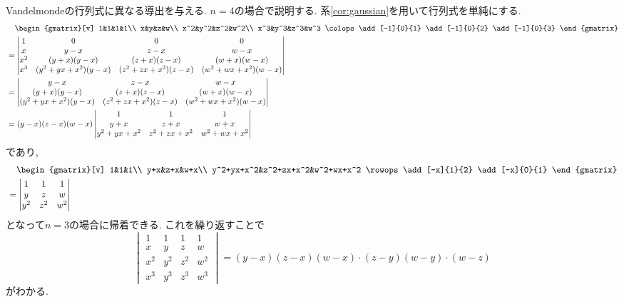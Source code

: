 \begin{eg}
Vandelmondeの行列式に異なる導出を与える.
$n=4$の場合で説明する.
系\ref{cor:gaussian}を用いて行列式を単純にする.
\begin{align*}
&\phantom{={}}\begin{gmatrix}[v]
1&1&1&1\\
x&y&z&w\\
x^2&y^2&z^2&w^2\\
x^3&y^3&z^3&w^3
\colops
\add[-1]{0}{1}
\add[-1]{0}{2}
\add[-1]{0}{3}
\end{gmatrix}\\
&=\begin{vmatrix}
1&0&0&0\\
x&y-x&z-x&w-x\\
x^2&(y+x)(y-x)&(z+x)(z-x)&(w+x)(w-x)\\
x^3&(y^2+yx+x^2)(y-x)&(z^2+zx+x^2)(z-x)&(w^2+wx+x^2)(w-x)
\end{vmatrix}\\
&=\begin{vmatrix}
y-x&z-x&w-x\\
(y+x)(y-x)&(z+x)(z-x)&(w+x)(w-x)\\
(y^2+yx+x^2)(y-x)&(z^2+zx+x^2)(z-x)&(w^2+wx+x^2)(w-x)
\end{vmatrix}\\
&=(y-x)(z-x)(w-x)\begin{vmatrix}
1&1&1\\
y+x&z+x&w+x\\
y^2+yx+x^2&z^2+zx+x^2&w^2+wx+x^2
\end{vmatrix}
\end{align*}
であり,
\begin{align*}
&\phantom{={}}\begin{gmatrix}[v]
1&1&1\\
y+x&z+x&w+x\\
y^2+yx+x^2&z^2+zx+x^2&w^2+wx+x^2
\rowops
\add[-x]{1}{2}
\add[-x]{0}{1}
\end{gmatrix}\\
&=\begin{vmatrix}
1&1&1\\
y&z&w\\
y^2&z^2&w^2
\end{vmatrix}
\end{align*}
となって$n=3$の場合に帰着できる.
これを繰り返すことで
\[\begin{vmatrix}
1&1&1&1\\
x&y&z&w\\
x^2&y^2&z^2&w^2\\
x^3&y^3&z^3&w^3
\end{vmatrix}
=(y-x)(z-x)(w-x)\cdot(z-y)(w-y)\cdot(w-z)\]
がわかる.
\end{eg}
